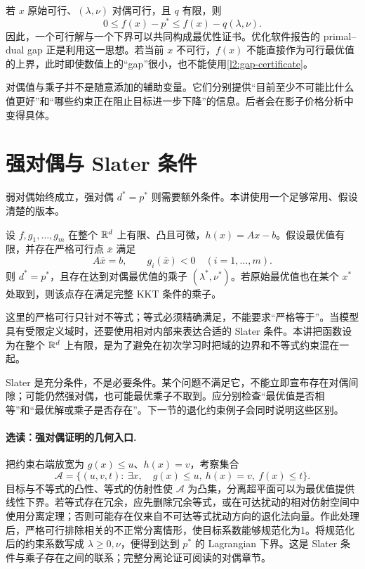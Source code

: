若 $x$ 原始可行、$(\lambda,\nu)$ 对偶可行，且 $q$ 有限，则
\begin{equation}
 0\leq f(x)-p^*\leq f(x)-q(\lambda,\nu).
 \label{l2:gap-certificate}
\end{equation}
因此，一个可行解与一个下界可以共同构成最优性证书。优化软件报告的 primal--dual gap 正是利用这一思想。若当前 $x$ 不可行，$f(x)$ 不能直接作为可行最优值的上界，此时即使数值上的“gap”很小，也不能使用\eqref{l2:gap-certificate}。

对偶值与乘子并不是随意添加的辅助变量。它们分别提供“目前至少不可能比什么值更好”和“哪些约束正在阻止目标进一步下降”的信息。后者会在影子价格分析中变得具体。

\section{强对偶与 Slater 条件}
\label{l2:slater}

弱对偶始终成立，强对偶 $d^*=p^*$ 则需要额外条件。本讲使用一个足够常用、假设清楚的版本\citep{Boyd2004}。

\begin{theorem}
\label{l2:thm-slater}
设 $f,g_1,\ldots,g_m$ 在整个 $\mathbb R^d$ 上有限、凸且可微，$h(x)=Ax-b$。假设最优值有限，并存在严格可行点 $\bar x$ 满足
\[
 A\bar x=b,\qquad g_i(\bar x)<0\quad(i=1,\ldots,m).
\]
则 $d^*=p^*$，且存在达到对偶最优值的乘子 $(\lambda^*,\nu^*)$。若原始最优值也在某个 $x^*$ 处取到，则该点存在满足完整 KKT 条件的乘子。
\end{theorem}

这里的严格可行只针对不等式；等式必须精确满足，不能要求“严格等于”。当模型具有受限定义域时，还要使用相对内部来表达合适的 Slater 条件。本讲把函数设为在整个 $\mathbb R^d$ 上有限，是为了避免在初次学习时把域的边界和不等式约束混在一起。

Slater 是充分条件，不是必要条件。某个问题不满足它，不能立即宣布存在对偶间隙；可能仍然强对偶，也可能最优乘子不取到。应分别检查“最优值是否相等”和“最优解或乘子是否存在”。下一节的退化约束例子会同时说明这些区别。

\paragraph{选读：强对偶证明的几何入口.}
把约束右端放宽为 $g(x)\leq u$、$h(x)=v$，考察集合
\[
 \mathcal A=\{(u,v,t):\ \exists x,\quad
       g(x)\leq u,\ h(x)=v,\ f(x)\leq t\}.
\]
目标与不等式的凸性、等式的仿射性使 $\mathcal A$ 为凸集，分离超平面可以为最优值提供线性下界。若等式存在冗余，应先删除冗余等式，或在可达扰动的相对仿射空间中使用分离定理；否则可能存在仅来自不可达等式扰动方向的退化法向量。作此处理后，严格可行排除相关的不正常分离情形，使目标系数能够规范化为1。将规范化后的约束系数写成 $\lambda\geq0,\nu$，便得到达到 $p^*$ 的 Lagrangian 下界。这是 Slater 条件与乘子存在之间的联系；完整分离论证可阅读\citet{Boyd2004}的对偶章节。

